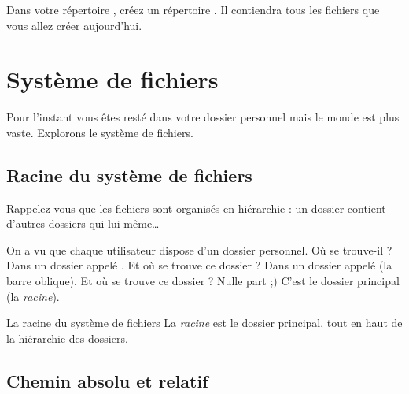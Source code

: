 \documentclass[a4paper,11pt]{style-esi/td}
\begin{document}
\entete
\titre
{}
\lastedit

\bigskip
\tableofcontents

\vfill
\begin{infobox}
    Dans votre répertoire , 
	créez un répertoire . 
    Il contiendra tous les fichiers que vous allez créer aujourd'hui. 
\end{infobox}
\vfill

\newpage

\section{Système de fichiers}

	Pour l'instant vous êtes resté dans votre dossier personnel 
	mais le monde est plus vaste.
	Explorons le système de fichiers.

	\subsection{Racine du système de fichiers}

		Rappelez-vous que les fichiers sont organisés en hiérarchie :
		un dossier contient d'autres dossiers qui lui-même\dots

		On a vu que chaque utilisateur dispose d'un dossier personnel. 
		Où se trouve-il ? Dans un dossier appelé . 
		Et où se trouve ce dossier  ? 
		Dans un dossier appelé \og{}\samp{/}\fg{} (la barre oblique). 
		Et où se trouve ce dossier \og{}\samp{/}\fg{} ? Nulle part ;) 
		C'est le dossier principal (la \emph{racine}).

		\begin{theorie}{La racine du système de fichiers}
			La \emph{racine} est le dossier principal, 
			tout en haut de la hiérarchie des dossiers.
		\end{theorie}

	\subsection{Chemin absolu et relatif}

		
\end{document}
